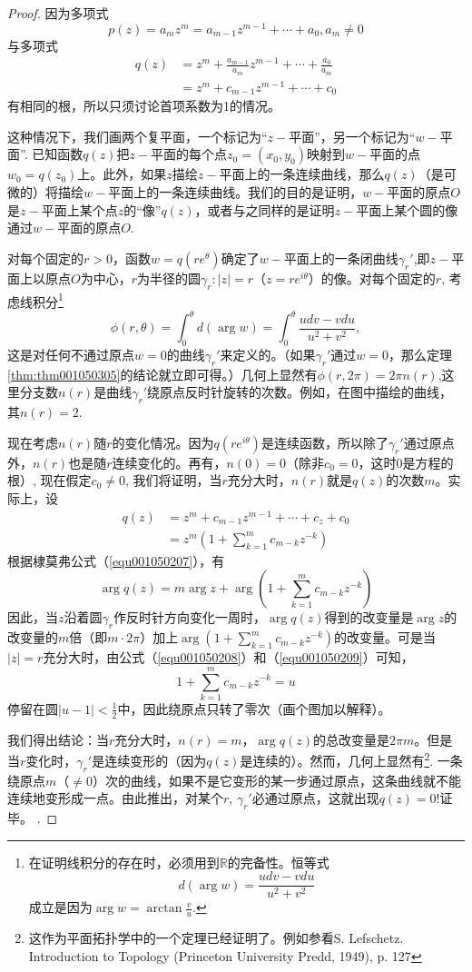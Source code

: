 \begin{proof}
因为多项式
\[
p(z) = a_mz^m =a_{m-1}z^{m-1}+\cdots+a_0, a_m \neq 0
\]
与多项式
\[
\begin{aligned}
q(z) &= z^m + \frac{a_{m-1}}{a_m}z^{m-1} + \cdots + \frac{a_0}{a_m} \\
&= z^m + c_{m-1}z^{m-1} + \cdots + c_0
\end{aligned}
\]
有相同的根，所以只须讨论首项系数为1的情况。

这种情况下，我们画两个复平面，一个标记为“$z-$平面”，另一个标记为“$w-$平面”. 已知函数$q(z)$把$z-$平面的每个点$z_0=(x_0, y_0)$映射到$w-$平面的点$w_0 = q(z_0)$上。此外，如果$z$描绘$z-$平面上的一条连续曲线，那么$q(z)$（是可微的）将描绘$w-$平面上的一条连续曲线。我们的目的是证明，$w-$平面的原点$O$是$z-$平面上某个点$z$的“像”$q(z)$，或者与之同样的是证明$z-$平面上某个圆的像通过$w-$平面的原点$O$.

对每个固定的$r > 0$，函数$w = q(re^{\theta})$确定了$w-$平面上的一条闭曲线$\gamma_r'$,即$z-$平面上以原点$O$为中心，$r$为半径的圆$\gamma_r: |z| = r$（$z = re^{i\theta}$）的像。对每个固定的$r$, 考虑线积分\footnote{在证明线积分的存在时，必须用到$\mathbb{R}$的完备性。恒等式\[d(\arg{w}) = \frac{udv - vdu}{u^2+v^2}\]成立是因为$\arg{w} = \arctan{\frac{v}{u}}$.}
\[
\phi(r, \theta) = \int_{0}^{\theta}{d(\arg{w})} = \int_{0}^{\theta}{\frac{udv - vdu}{u^2+v^2}},
\]
这是对任何不通过原点$w=0$的曲线$\gamma_r'$来定义的。（如果$\gamma_r'$通过$w=0$，那么定理\ref{thm:thm001050305}的结论就立即可得。）几何上显然有$\phi(r, 2\pi) = 2\pi{}n(r)$,这里分支数$n(r)$是曲线$\gamma_r'$绕原点反时针旋转的次数。例如，在图中描绘的曲线，其$n(r)=2$.

现在考虑$n(r)$随$r$的变化情况。因为$q(re^{i\theta})$是连续函数，所以除了$\gamma_r'$通过原点外，$n(r)$也是随$r$连续变化的。再有，$n(0)=0$（除非$c_0=0$，这时$0$是方程的根）, 现在假定$c_0 \neq 0$, 我们将证明，当$r$充分大时，$n(r)$就是$q(z)$的次数$m$。实际上，设
\[
\begin{aligned}
q(z) &= z^m + c_{m-1}z^{m-1} + \cdots + c_z+c_0\\
&=z^{m}\left(1 + \sum_{k=1}^{m}{c_{m-k}z^{-k}}\right)
\end{aligned}
\]
根据棣莫弗公式（\ref{equ001050207}），有
\[
\arg{q(z)} = m\arg{z} + \arg{\left(1 + \sum_{k=1}^{m}{c_{m-k}z^{-k}}\right)}
\]
因此，当$z$沿着圆$\gamma_r$作反时针方向变化一周时，$\arg{q(z)}$得到的改变量是$\arg{z}$的改变量的$m$倍（即$m \cdot 2\pi$）加上$\arg{\left(1 + \sum\limits_{k=1}^{m}{c_{m-k}z^{-k}}\right)}$的改变量。可是当$|z| = r$充分大时，由公式（\ref{equ001050208}）和（\ref{equ001050209}）可知，
\[
1 + \sum_{k=1}^{m}{c_{m-k}z^{-k}} = u
\]
停留在圆$|u-1|<\frac{1}{2}$中，因此绕原点只转了零次（画个图加以解释）。

我们得出结论：当$r$充分大时，$n(r)=m$，$\arg{q(z)}$的总改变量是$2\pi{}m$。但是当$r$变化时，$\gamma_r'$是连续变形的（因为$q(z)$是连续的）。然而，几何上显然有\footnote{这作为平面拓扑学中的一个定理已经证明了。例如参看S. Lefschetz. Introduction to Topology (Princeton University Predd, 1949), p. 127}. 一条绕原点$m$（$\neq 0$）次的曲线，如果不是它变形的某一步通过原点，这条曲线就不能连续地变形成一点。由此推出，对某个$r$, $\gamma_r'$必通过原点，这就出现$q(z)=0$!证毕。
.\end{proof}

